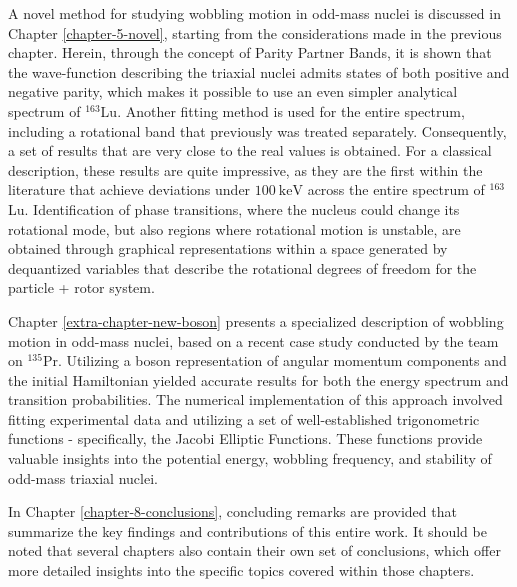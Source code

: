 A novel method for studying wobbling motion in odd-mass nuclei is discussed in Chapter \ref{chapter-5-novel}, starting from the considerations made in the previous chapter. Herein, through the concept of Parity Partner Bands, it is shown that the wave-function describing the triaxial nuclei admits states of both positive and negative parity, which makes it possible to use an even simpler analytical spectrum of $^{163}$Lu. Another fitting method is used for the entire spectrum, including a rotational band that previously was treated separately. Consequently, a set of results that are very close to the real values is obtained. For a classical description, these results are quite impressive, as they are the first within the literature that achieve deviations under $100\ \text{keV}$ across the entire spectrum of $^{163}$Lu. Identification of phase transitions, where the nucleus could change its rotational mode, but also regions where rotational motion is unstable, are obtained through graphical representations within a space generated by dequantized variables that describe the rotational degrees of freedom for the particle + rotor system. 

Chapter \ref{extra-chapter-new-boson} presents a specialized description of wobbling motion in odd-mass nuclei, based on a recent case study conducted by the team on $^{135}$Pr. Utilizing a boson representation of angular momentum components and the initial Hamiltonian yielded accurate results for both the energy spectrum and transition probabilities. The numerical implementation of this approach involved fitting experimental data and utilizing a set of well-established trigonometric functions - specifically, the Jacobi Elliptic Functions. These functions provide valuable insights into the potential energy, wobbling frequency, and stability of odd-mass triaxial nuclei.

In Chapter \ref{chapter-8-conclusions}, concluding remarks are provided that summarize the key findings and contributions of this entire work. It should be noted that several chapters also contain their own set of conclusions, which offer more detailed insights into the specific topics covered within those chapters.